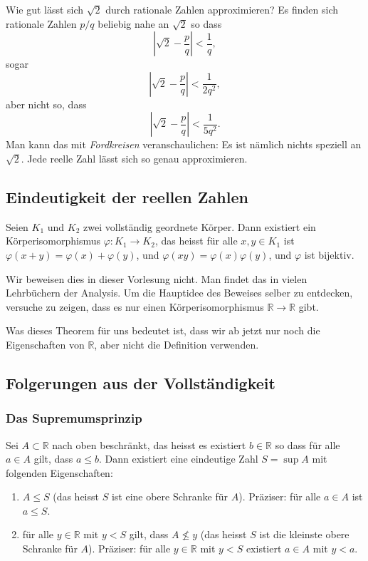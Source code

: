 \documentclass[../main.tex]{subfiles}
\begin{document}
\begin{einschub}
  Wie gut lässt sich $\sqrt 2$ durch rationale Zahlen
  approximieren? Es finden sich rationale Zahlen $p/q$ beliebig
  nahe an $\sqrt 2$ so dass
  \[
    \left\vert \sqrt 2 - \frac{p}{q} \right\vert < \frac{1}{q},
  \]
  sogar
  \[
    \left\vert \sqrt 2 - \frac{p}{q} \right\vert < \frac{1}{2q^2},
  \]
  aber nicht so, dass
  \[
    \left\vert \sqrt 2 - \frac{p}{q} \right\vert < \frac{1}{5q^2}.
  \]
  Man kann das mit \textit{Fordkreisen} veranschaulichen:
  Es ist nämlich nichts speziell an $\sqrt 2$. Jede reelle Zahl
  lässt sich so genau approximieren.
\end{einschub}

\subsection*{Eindeutigkeit der reellen Zahlen}
\begin{theorem}[Dedekind]
  Seien $K_1$ und $K_2$ zwei vollständig geordnete Körper.
  Dann existiert ein Körperisomorphismus
  $\varphi\colon K_1 \to K_2$, das heisst
	   für alle $x, y \in K_1$ ist $\varphi(x+y)
		  = \varphi(x) + \varphi(y)$,
		  und $\varphi(xy) = \varphi(x)\varphi(y)$,
	und $\varphi$ ist bijektiv.
\end{theorem}
Wir beweisen dies in dieser Vorlesung nicht.
Man findet das in vielen Lehrbüchern der Analysis.
Um die Hauptidee des Beweises selber zu entdecken,
versuche zu zeigen, dass es nur einen Körperisomorphismus
$\mathbb{R} \to \mathbb{R}$ gibt.

Was dieses Theorem für uns bedeutet ist, dass wir ab jetzt
nur noch die Eigenschaften von $\mathbb{R}$, aber nicht
die Definition verwenden.

\subsection*{Folgerungen aus der Vollständigkeit}
\subsubsection*{Das Supremumsprinzip}
\begin{claim}[Supremumsprinzip]
Sei $A \subset \mathbb{R}$ nach oben beschränkt,
das heisst es existiert $b \in \mathbb{R}$ so dass
für alle $a \in A$ gilt, dass $a \leq b$.
Dann existiert eine eindeutige Zahl $S = \sup A$
mit folgenden Eigenschaften:
\begin{enumerate}[\normalfont(i)]
	\item $A \leq S$ (das heisst $S$ ist eine obere Schranke
		für $A$). Präziser: für alle $a \in A$
		ist $a \leq S$.
  \item für alle $y \in \mathbb{R}$ mit $y < S$ gilt,
	  dass $A \not \leq y$ (das heisst $S$ ist die kleinste
	  obere Schranke für $A$). Präziser: für alle $y \in \mathbb{R}$
	  mit $y < S$ existiert $a \in A$ mit $y < a$.
\end{enumerate}
\end{claim}
\end{document}
